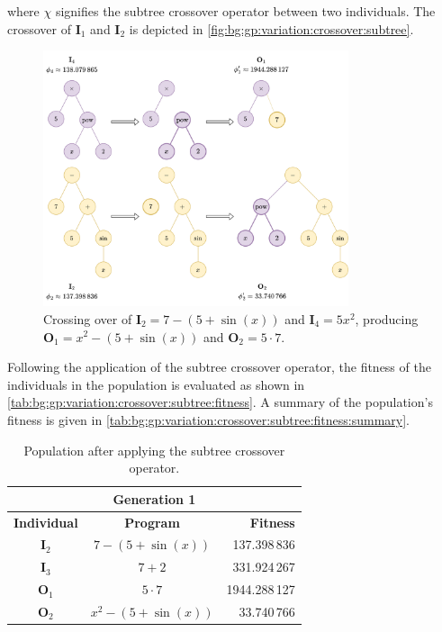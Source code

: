   where \(\chi\) signifies the subtree crossover operator between two 
  individuals.
  The crossover of \(\mathbf{I}_1\) and \(\mathbf{I}_2\) is depicted in
  \vref{fig:bg:gp:variation:crossover:subtree}.

  \begin{figure}[ht!]
    \centering
    \includegraphics[width=0.8\textwidth]
      {img/theoretical_framework/GP Crossover.png}
    \caption{
      Crossing over of \(\mathbf{I}_2 = 7 - (5 + \sin(x))\) and 
      \(\mathbf{I}_4 = 5x^2\), producing \(\mathbf{O}_1 = x^2 - (5 + \sin(x))\) 
      and \(\mathbf{O}_2 = 5 \cdot 7\).
    }
    \label{fig:bg:gp:variation:crossover:subtree}
  \end{figure}


    Following the application of the subtree crossover operator, the fitness of 
    the individuals in the population is evaluated as shown in 
    \vref{tab:bg:gp:variation:crossover:subtree:fitness}.
    A summary of the population's fitness is given in 
    \vref{tab:bg:gp:variation:crossover:subtree:fitness:summary}.

    \begin{table}[ht!]
      \centering
      \begin{tabular}{c|c|r}
        \multicolumn{3}{c}{\textbf{Generation 1}} \\
        \hline
        \hline
        \textbf{Individual} & \textbf{Program}        & \textbf{Fitness} \\
        \hline
        \(\mathbf{I}_2\)    & \(7 - (5 + \sin(x))\)   & 137.398\,836 \\
        \(\mathbf{I}_3\)    & \(7 + 2\)               & 331.924\,267 \\
        \(\mathbf{O}_1\)    & \(5 \cdot 7\)           & 1944.288\,127 \\
        \(\mathbf{O}_2\)    & \(x^2 - (5 + \sin(x))\) & 33.740\,766
      \end{tabular}
      \caption{Population after applying the subtree crossover operator.}
      \label{tab:bg:gp:variation:crossover:subtree:fitness}
    \end{table}


